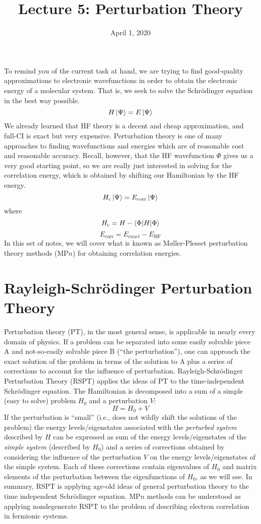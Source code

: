 \documentclass{article}
\title{Lecture 5: Perturbation Theory}
\date{April 1, 2020}
\newcommand{\Ecorr}{E_{\mathrm{corr}}}
\newcommand{\Hc}{H_{\mathrm{c}}}
\begin{document}
\maketitle
\noindent
To remind you of the current task at hand, we are trying to find good-quality approximations 
    to electronic wavefunctions in order to obtain the electronic energy of a molecular system. 
That is, we seek to solve the Schr{\"o}dinger equation in the best way possible.
\[H \ket{\Psi} = E \ket{\Psi} \]
We already learned that HF theory is a decent and cheap approximation, and full-CI is exact but very expensive. 
Perturbation theory is one of many approaches to finding wavefunctions and energies which are of 
    reasonable cost and reasonable accuracy.
Recall, however, that the HF wavefunction $\Phi$ gives us a very good starting point, so we are really just interested in solving for the correlation energy,
which is obtained by shifting our Hamiltonian by the HF energy.
\[\Hc \ket{\Psi} = \Ecorr \ket{\Psi} \]
where 
\[\Hc = H - \braket{\Phi| H | \Phi} \]
\[\Ecorr = E_{\mathrm{exact}} - E_{\mathrm{HF}}\]
In this set of notes, we will cover what is known as M{\o}ller-Plesset perturbation theory methods (MP$n$) 
    for obtaining correlation energies.

\section{Rayleigh-Schr{\"o}dinger Perturbation Theory}
Perturbation theory (PT), in the most general sense, is applicable in nearly every domain of physics. 
If a problem can be separated into some easily solvable piece A and not-so-easily solvable piece B 
    (``the perturbation''), one can approach the exact solution of the problem in terms of the solution to A 
    plus a series of corrections to account for the influence of perturbation.
Rayleigh-Schr{\"o}dinger Perturbation Theory (RSPT) applies the ideas of PT to the time-independent 
    Schr{\"o}dinger equation.
The Hamiltonian is decomposed into a sum of a simple (easy to solve) problem $H_0$ and a perturbation $V$:
\[H = H_0 + V \]
If the perturbation is ``small'' (i.e., does not wildly shift the solutions of the problem) the 
    energy levels/eigenstates associated with the \textit{perturbed system} described by $H$ can be expressed 
    as sum of the energy levels/eigenstates of  the \textit{simple system} (described by $H_0$) and a series 
    of corrections obtained by considering the influence of the perturbation $V$ on the 
    energy levels/eigenstates of the simple system.
Each of these corrections contain eigenvalues of $H_0$ and matrix elements of the perturbation 
    between the eigenfunctions of $H_0$, as we will see.
In summary, RSPT is applying age-old ideas of general perturbation theory to the
    time independent Schr{\"o}dinger equation.
MP$n$ methods can be understood as applying nondegenerate RSPT to the problem
    of describing electron correlation in fermionic systems. 
\end{document}
